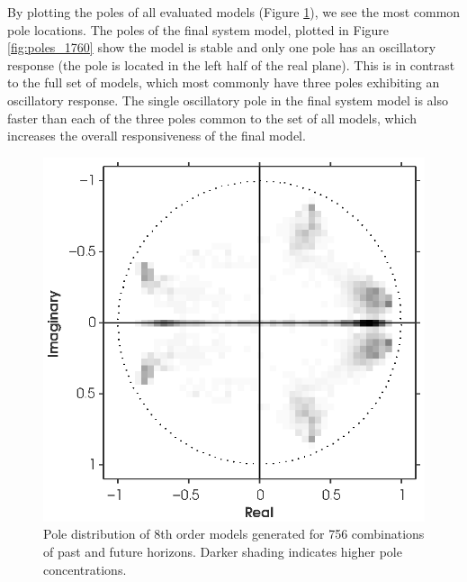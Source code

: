 By plotting the poles of all evaluated models (Figure \ref{fig:poles_all}), we see the most common pole locations. The poles of the final system model, plotted in Figure \ref{fig:poles_1760} show the model is stable and only one pole has an oscillatory response (the pole is located in the left half of the real plane). This is in contrast to the full set of models, which most commonly have three poles exhibiting an oscillatory response. The single oscillatory pole in the final system model is also faster than each of the three poles common to the set of all models, which increases the overall responsiveness of the final model. 

\begin{figure}[htb!]
	\centering
	\includegraphics{../fig/poles_all.eps}
	\caption{Pole distribution of 8th order models generated for 756 combinations of past and future horizons. Darker shading indicates higher pole concentrations.}
	\label{fig:poles_all}
\end{figure}

